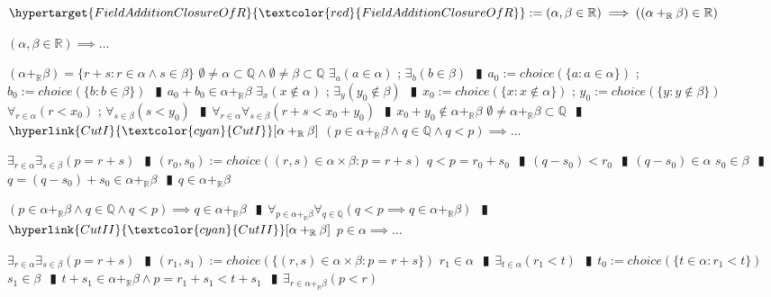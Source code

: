 \documentclass{book}
\newcommand{\df}[1]{\hypertarget{#1}{\textcolor{red}{#1}}}
\newcommand{\rf}[1]{\hyperlink{#1}{\textcolor{cyan}{#1}}}
\newcommand{\abr}{:=}
\newcommand{\pipe}{$\phantom{(}\vrectangleblack\phantom{)}$}
\begin{document}
$\df{FieldAdditionClosureOfR} \abr (\alpha, \beta \in \mathbb{R}) \implies ((\alpha +_{\mathbb{R}} \beta) \in \mathbb{R})$
\begin{enumerate}
  \lit $(\alpha, \beta \in \mathbb{R}) \implies \ldots$
  \begin{enumerate}
    \lit $(\alpha +_{\mathbb{R}} \beta) = \{r + s : r \in \alpha \land s \in \beta\}$
    \lit $\emptyset \neq \alpha \subset \mathbb{Q} \land \emptyset \neq \beta \subset \mathbb{Q}$
    \lit $\exists_{a}(a \in \alpha)$ ; $\exists_{b}(b \in \beta)$ \pipe $a_0 \abr choice(\{a : a \in \alpha\})$ ; $b_0 \abr choice(\{b : b \in \beta\})$ \pipe $a_0  + b_0 \in \alpha +_{\mathbb{R}} \beta$
    \lit $\exists_{x}(x \notin \alpha)$ ; $\exists_{y}(y_0 \notin \beta)$ \pipe $x_0 \abr choice(\{x : x \notin \alpha\})$ ; $y_0 \abr choice(\{y : y \notin \beta\})$
    \lit $\forall_{r \in \alpha}(r < x_0)$ ; $\forall_{s \in \beta}(s < y_0)$ \pipe $\forall_{r \in \alpha} \forall_{s \in \beta}(r + s < x_0 + y_0)$ \pipe $x_0 + y_0 \not \in \alpha +_{\mathbb{R}} \beta$
    \lit $\emptyset \neq \alpha +_{\mathbb{R}} \beta \subset \mathbb{Q}$ \pipe $\rf{CutI}[\alpha +_{\mathbb{R}} \beta]$
    \lit $(p \in \alpha +_{\mathbb{R}} \beta \land q \in \mathbb{Q} \land q < p) \implies \ldots$
    \begin{enumerate}
      \lit $\exists_{r \in \alpha} \exists_{s \in \beta}(p = r + s)$ \pipe $(r_0, s_0) \abr choice({(r, s) \in \alpha \times \beta : p = r + s})$
      \lit $q < p = r_0 + s_0$ \pipe $(q - s_0) < r_0$ \pipe $(q - s_0) \in \alpha$
      \lit $s_0 \in \beta$ \pipe $q = (q - s_0) + s_0 \in \alpha +_{\mathbb{R}} \beta$ \pipe $q \in \alpha +_{\mathbb{R}} \beta$
    \end{enumerate}
    \lit $(p \in \alpha +_{\mathbb{R}} \beta \land q \in \mathbb{Q} \land q < p) \implies q \in \alpha +_{\mathbb{R}} \beta$ \pipe $\forall_{p \in \alpha +_{\mathbb{R}} \beta} \forall_{q \in \mathbb{Q}}(q < p \implies q \in \alpha +_{\mathbb{R}} \beta)$ \pipe $\rf{CutII}[\alpha +_{\mathbb{R}} \beta]$
    \lit $p \in \alpha \implies \ldots$
    \begin{enumerate}
      \lit $\exists_{r \in \alpha} \exists_{s \in \beta}(p = r + s)$ \pipe $(r_1, s_1) \abr choice(\{(r, s) \in \alpha \times \beta : p = r + s\})$
      \lit $r_1 \in \alpha$ \pipe $\exists_{t \in \alpha}(r_1 < t)$ \pipe $t_0 \abr choice(\{t \in \alpha : r_1 < t\})$
      \lit $s_1 \in \beta$ \pipe $t + s_1 \in \alpha +_{\mathbb{R}} \beta \land p = r_1 + s_1 < t + s_1$ \pipe $\exists_{r \in \alpha +_{\mathbb{R}} \beta}(p < r)$
    \end{enumerate}

\end{enumerate}
\end{enumerate}
\end{document}
